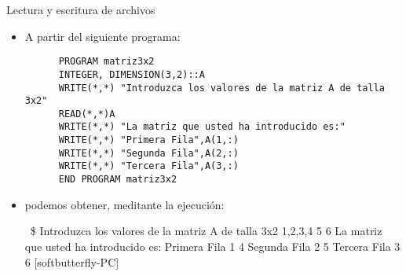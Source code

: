 \begin{frame}[fragile]{Lectura y escritura de archivos} 
    \begin{itemize}[<+(0)->]
     \item [] A partir del siguiente programa:
      \vspace{0.1cm}
      \begin{verbatim}
      PROGRAM matriz3x2
      INTEGER, DIMENSION(3,2)::A
      WRITE(*,*) "Introduzca los valores de la matriz A de talla 3x2"
      READ(*,*)A
      WRITE(*,*) "La matriz que usted ha introducido es:"
      WRITE(*,*) "Primera Fila",A(1,:)
      WRITE(*,*) "Segunda Fila",A(2,:)
      WRITE(*,*) "Tercera Fila",A(3,:)
      END PROGRAM matriz3x2
      \end{verbatim}

     \item [] podemos obtener, meditante la ejecución:
      \begin{mintedbashbox}
      [softbutterfly\@SB-PC] ~\$     
      Introduzca los valores de la matriz A de talla 3x2
      1,2,3,4 5 6
      La matriz que usted ha introducido es:
      Primera Fila           1           4
      Segunda Fila           2           5
      Tercera Fila           3           6
      [softbutterfly\@SB-PC]    
      \end{mintedbashbox}
    \end{itemize}
\end{frame}